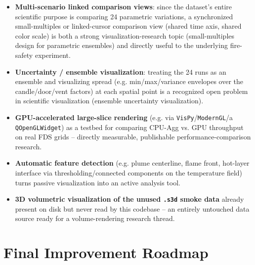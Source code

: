 \documentclass[11pt,a4paper]{report}
\begin{document}
\begin{itemize}
\item \textbf{Multi-scenario linked comparison views}: since the dataset's entire scientific purpose is
comparing 24 parametric variations, a synchronized small-multiples or linked-cursor comparison view
(shared time axis, shared color scale) is both a strong visualization-research topic (small-multiples
design for parametric ensembles) and directly useful to the underlying fire-safety experiment.
\item \textbf{Uncertainty / ensemble visualization}: treating the 24 runs as an ensemble and visualizing
spread (e.g. min/max/variance envelopes over the candle/door/vent factors) at each spatial point is a
recognized open problem in scientific visualization (ensemble uncertainty visualization).
\item \textbf{GPU-accelerated large-slice rendering} (e.g. via \texttt{VisPy}/\texttt{ModernGL}/a
\texttt{QOpenGLWidget}) as a testbed for comparing CPU-Agg vs. GPU throughput on real FDS grids --
directly measurable, publishable performance-comparison research.
\item \textbf{Automatic feature detection} (e.g. plume centerline, flame front, hot-layer interface
via thresholding/connected components on the temperature field) turns passive visualization into an
active analysis tool.
\item \textbf{3D volumetric visualization of the unused \texttt{.s3d} smoke data} already present on
disk but never read by this codebase -- an entirely untouched data source ready for a volume-rendering
research thread.
\end{itemize}

\chapter{Final Improvement Roadmap}
\end{document}
